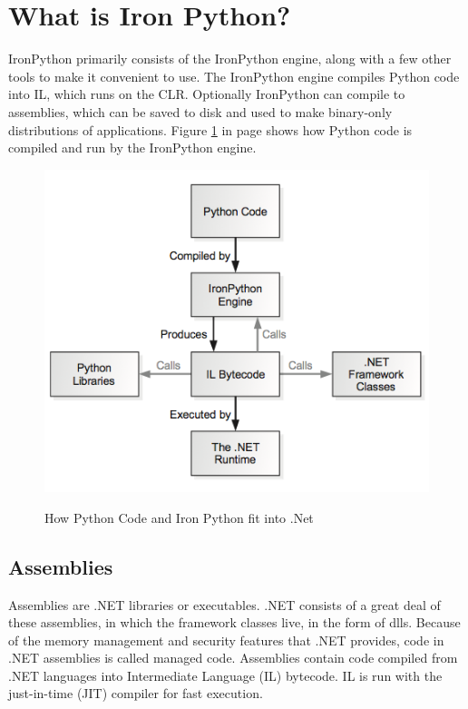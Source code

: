 \documentclass[12pt,a4paper,final,twoside,titlepage]{book}
\begin{document}
\section{What is Iron Python?}
IronPython primarily consists of the IronPython engine, along with a few other tools to make it convenient to use. The IronPython engine compiles Python code into IL, which runs on the CLR. Optionally IronPython can compile to assemblies, which can be saved to disk and used to make binary-only distributions of applications. Figure \ref{Iron Python and .Net} in page \pageref{Iron Python and .Net} shows how Python code is compiled and run by the IronPython engine.

\begin{center}
\begin{figure}
\includegraphics[scale=0.75]{IronPythonEngine}
\caption{How Python Code and Iron Python fit into .Net} \begin{center}
\citep{foord2009ironpython}
\end{center}
\label{Iron Python and .Net} 
\end{figure}
\end{center}

\subsection{Assemblies}
Assemblies are .NET libraries or executables. .NET consists of a great deal of these assemblies, in which the framework classes live, in the form of dlls. Because of the memory management and security features that .NET provides, code in .NET assemblies is called managed code. Assemblies contain code compiled from .NET languages into Intermediate Language (IL) bytecode. IL is run with the just-in-time (JIT) compiler for fast execution.
\end{document}
